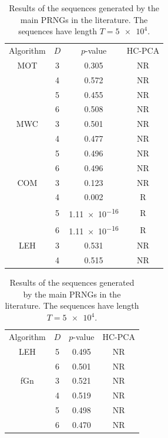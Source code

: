 \begin{table}
	\caption{Results of the sequences generated by the main PRNGs in the literature. 
		The sequences have length $T=\num[scientific-notation = true]{5 e4}$.}
	\label{Tab:LiteratureComparations}
	\centering
	\begin{tabular}{cccc}
		\toprule
		Algorithm & 
		\multicolumn{1}{c}{$D$} & 
		$p$-value &
		HC-PCA\\
		\cmidrule(lr){1-1}
		\cmidrule(lr){2-2}
		\cmidrule(lr){3-3}
		\cmidrule(lr){4-4}
		MOT & 3 & 0.305 & NR\\
		& 4 & 0.572 & NR\\ 
		& 5 & 0.455 & NR\\ 
		& 6 & 0.508 & NR\\ 
		\cmidrule(lr){1-4}
		MWC & 3 & 0.501 & NR\\
		& 4 & 0.477 & NR\\ 
		& 5 & 0.496 & NR\\ 
		& 6 & 0.496 & NR\\ 
		\cmidrule(lr){1-4}
		COM & 3 & 0.123 & NR\\
		& 4 & 0.002 & R\\ 
		& 5 & \num[scientific-notation=true]{1.11 e-16} & R\\ 
		& 6 & \num[scientific-notation=true]{1.11 e-16} & R\\ 
		\cmidrule(lr){1-4}
		LEH & 3 & 0.531 & NR\\
		& 4 & 0.515 & NR\\ 
		\bottomrule
	\end{tabular}
	\begin{tabular}{|cccc}
		\toprule
		Algorithm & 
		\multicolumn{1}{c}{$D$} & 
		$p$-value &
		HC-PCA\\
		\cmidrule(lr){1-1}
		\cmidrule(lr){2-2}
		\cmidrule(lr){3-3}
		\cmidrule(lr){4-4}
		LEH & 5 & 0.495 & NR\\ 
		& 6 & 0.501 & NR\\ 
		\cmidrule(lr){1-4}
		fGn & 3 & 0.521 & NR\\
		& 4 & 0.519 & NR\\ 
		& 5 & 0.498 & NR\\ 
		& 6 & 0.470 & NR\\
		\cmidrule(lr){1-4}

\end{tabular}
\end{table}
